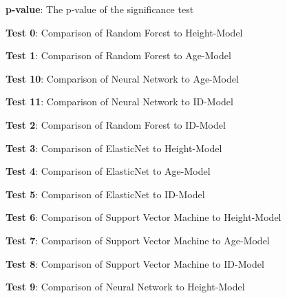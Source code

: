 \documentclass[11pt]{article}
\begin{document}
\begin{codeoutput}
\begin{table}[h]
\begin{threeparttable}
\begin{tablenotes}
\item \textbf{p-value}: The p-value of the significance test
\item \textbf{Test 0}: Comparison of Random Forest to Height-Model
\item \textbf{Test 1}: Comparison of Random Forest to Age-Model
\item \textbf{Test 10}: Comparison of Neural Network to Age-Model
\item \textbf{Test 11}: Comparison of Neural Network to ID-Model
\item \textbf{Test 2}: Comparison of Random Forest to ID-Model
\item \textbf{Test 3}: Comparison of ElasticNet to Height-Model
\item \textbf{Test 4}: Comparison of ElasticNet to Age-Model
\item \textbf{Test 5}: Comparison of ElasticNet to ID-Model
\item \textbf{Test 6}: Comparison of Support Vector Machine to Height-Model
\item \textbf{Test 7}: Comparison of Support Vector Machine to Age-Model
\item \textbf{Test 8}: Comparison of Support Vector Machine to ID-Model
\item \textbf{Test 9}: Comparison of Neural Network to Height-Model
\end{tablenotes}
\end{threeparttable}
\end{table}
\end{codeoutput}
\end{document}

